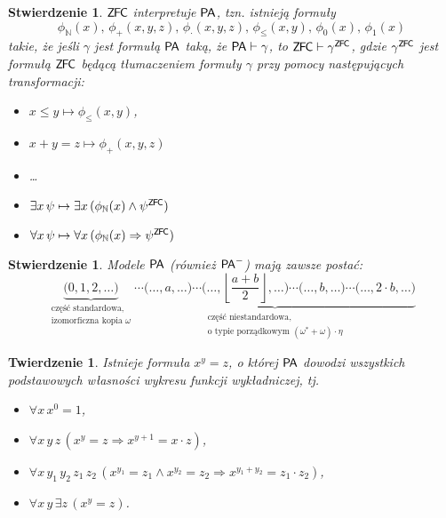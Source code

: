 \documentclass{article}
\newcommand{\N}{\mathbb{N}}
\theoremstyle{plain}
\newtheorem{tw}[thm]{Twierdzenie}
\newtheorem{stw}[thm]{Stwierdzenie}
\theoremstyle{definition}
\theoremstyle{remark}
\newcommand{\PA}{\mathsf{P \mkern-1.9mu A}}
\newcommand{\ZFC}{\mathsf{Z \mkern-1.6mu F \mkern-1.5mu C}}
\begin{document}
\begin{stw}
	$\ZFC$ interpretuje $\PA$, tzn. istnieją formuły
	\[
		\phi_{\N}(x),\, \phi_+(x, y, z),\, \phi_{\cdot}(x, y, z),\, \phi_{\leq}(x, y),\, \phi_0(x),\, \phi_1(x)
	\]
	takie, że jeśli $\gamma$ jest formułą $\PA$ taką, że $\PA \vdash \gamma$, to $\ZFC \vdash \gamma^{\ZFC}$, gdzie $\gamma^{\ZFC}$ jest formułą $\ZFC$ będącą tłumaczeniem formuły $\gamma$ przy pomocy następujących transformacji:
	\begin{itemize}
		\item $x \leq y \mapsto \phi_{\leq}(x, y)$,
		\item $x + y = z \mapsto \phi_{+}(x, y, z)$
		\item \ldots
		\item $\exists x \, \psi \mapsto \exists x \, (\phi_{\N}(x) \wedge \psi^{\ZFC}) $
		\item $\forall x \, \psi \mapsto \forall x \, (\phi_{\N}(x) \Rightarrow \psi^{\ZFC}) $
	\end{itemize}

\end{stw}
\begin{stw}
	\label{stw:model_pa}
	Modele $\PA$ (również $\PA^-$) mają zawsze postać:
	\[ \underbrace{\big(0, 1, 2,  \ldots\big)}_{\substack{\text{część standardowa,} \\ \text{izomorficzna kopia } \omega}}
\underbrace{\cdots \big(\ldots, a , \ldots\big)\cdots\big(\ldots, \left\lfloor\frac {a + b}{2}\right\rfloor, \ldots\big) \cdots
\big(\ldots, b, \ldots\big)\cdots\big(\ldots, 2\cdot b, \ldots\big)}_{\substack{\text{część niestandardowa,}\\ \text{o typie porządkowym }(\omega^{\ast} + \omega) \cdot \eta}} \]

\end{stw}
\begin{tw}
	 Istnieje formuła $x^y=z$, o której $\PA$ dowodzi wszystkich podstawowych własności wykresu funkcji wykładniczej, tj.
	 \begin{itemize}
		 \item $\forall x \, x^0=1$,
		 \item $\forall x\, y\, z \, (x^y=z \Rightarrow x^{y+1} = x \cdot z)$,
		 \item $\forall x\, y_1\, y_2\, z_1\, z_2 \, (x^{y_1} = z_1 \wedge x^{y_2} = z_2 \Rightarrow x^{y_1 + y_2} = z_1 \cdot z_2)$,
		 \item $\forall x\, y \, \exists z \, (x^y = z)$.
	 \end{itemize}
\end{tw}
\end{document}
